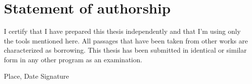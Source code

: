 \documentclass[twoside,12pt,a4paper, parskip=full-]{report}
\begin{document}

\cleardoublepage


\cleardoublepage







\cleardoublepage


\printindex

\cleardoublepage

\thispagestyle{empty}
\section*{Statement of authorship}

I certify that I have prepared this thesis independently and that I'm using only the tools mentioned here. All passages that have been taken from other works are characterized as borrowing. This thesis has been submitted in identical or similar form in any other program as an examination.

\vskip 3cm

Place, Date	\hfill Signature \hfill 
\end{document}
